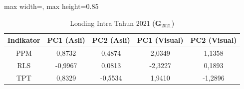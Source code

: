 \begin{table}[H]
\centering
\caption{Loading Intra Tahun 2021 ($\mathbf{G}_{2021}$)} \label{tab:sample1loading_intra_2021}
\begin{adjustbox}{max width=\textwidth, max height=0.85\textheight}
\begin{tabular}{|c|c|c|c|c|}
\hline
\textbf{Indikator} & \textbf{PC1 (Asli)} & \textbf{PC2 (Asli)} & \textbf{PC1 (Visual)} & \textbf{PC2 (Visual)} \\
\hline
PPM & 0,8732 & 0,4874 & 2,0349 & 1,1358 \\
RLS & -0,9967 & 0,0813 & -2,3227 & 0,1893 \\
TPT & 0,8329 & -0,5534 & 1,9410 & -1,2896 \\
\hline
\end{tabular}
\end{adjustbox}
\end{table}